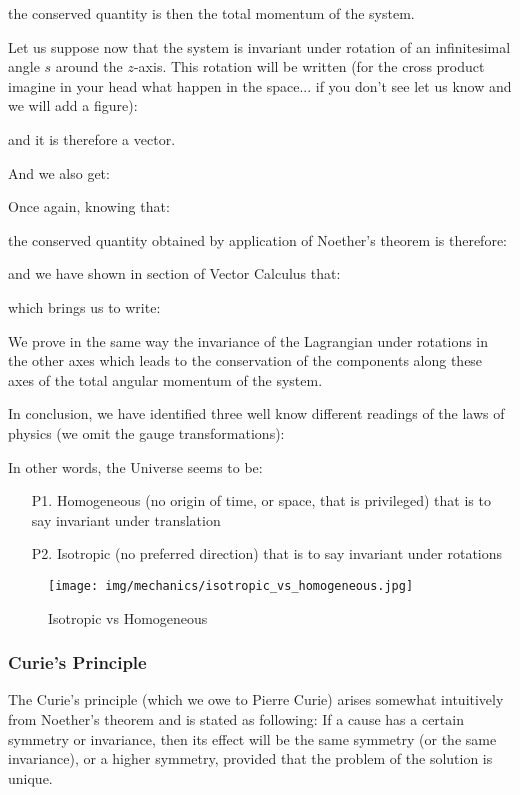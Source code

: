 	the conserved quantity is then the total momentum of the system.

	Let us suppose now that the system is invariant under rotation of an infinitesimal angle $s$ around the $z$-axis. This rotation will be written (for the cross product imagine in your head what happen in the space... if you don't see let us know and we will add a figure):
	
	and it is therefore a vector.

	And we also get:
	
	Once again, knowing that:
	
	the conserved quantity obtained by application of Noether's theorem is therefore:
	
	and we have shown in section of Vector Calculus that:
	
	which brings us to write:
	
	We prove in the same way the invariance of the Lagrangian under rotations in the other axes which leads to the conservation of the components along these axes of the total angular momentum of the system.

	In conclusion, we have identified three well know different readings of the laws of physics (we omit the gauge transformations):
	
	In other words, the Universe seems to be:
	\begin{enumerate}
		\item[P1.] Homogeneous (no origin of time, or space, that is privileged) that is to say invariant under translation

		\item[P2.] Isotropic (no preferred direction) that is to say invariant under rotations
	\end{enumerate} 
	\begin{figure}[H]
		\centering
		\texttt{[image: img/mechanics/isotropic\_vs\_homogeneous.jpg]}
		\caption{Isotropic vs Homogeneous}
	\end{figure}
	
	\pagebreak
	\subsubsection{Curie's Principle}
	The Curie's principle (which we owe to Pierre Curie) arises somewhat intuitively from Noether's theorem and is stated as following: If a cause has a certain symmetry or invariance, then its effect will be the same symmetry (or the same invariance), or a higher symmetry, provided that the problem of the solution is unique.
	

